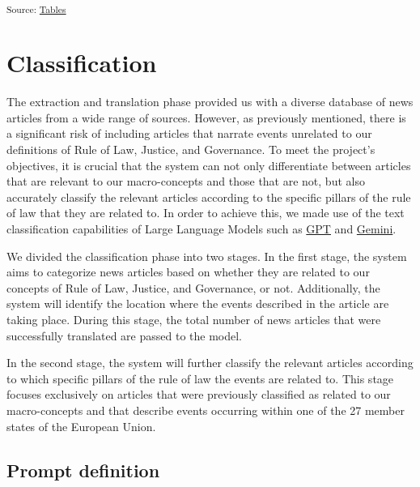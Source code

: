 \documentclass[
]{agujournal2019}
\begin{document}
\textsubscript{Source:
\href{https://ctoruno.github.io/eu-rol-tracker/notebooks/tables-preview.html\#cell-tbl-translation}{Tables}}

\section{Classification}\label{sec-class}

The extraction and translation phase provided us with a diverse database
of news articles from a wide range of sources. However, as previously
mentioned, there is a significant risk of including articles that
narrate events unrelated to our definitions of Rule of Law, Justice, and
Governance. To meet the project's objectives, it is crucial that the
system can not only differentiate between articles that are relevant to
our macro-concepts and those that are not, but also accurately classify
the relevant articles according to the specific pillars of the rule of
law that they are related to. In order to achieve this, we made use of
the text classification capabilities of Large Language Models such as
\href{https://platform.openai.com/docs/concepts}{GPT} and
\href{https://ai.google.dev/gemini-api/docs?_gl=1*1ixp628*_ga*NzAxMDUzNTUyLjE3MDQ0NTQ0NzA.*_ga_P1DBVKWT6V*MTcyNTkwNDYyMi40OC4wLjE3MjU5MDQ2MjIuNjAuMC41MjU1MDg0ODg.}{Gemini}.

We divided the classification phase into two stages. In the first stage,
the system aims to categorize news articles based on whether they are
related to our concepts of Rule of Law, Justice, and Governance, or not.
Additionally, the system will identify the location where the events
described in the article are taking place. During this stage, the total
number of news articles that were successfully translated are passed to
the model.

In the second stage, the system will further classify the relevant
articles according to which specific pillars of the rule of law the
events are related to. This stage focuses exclusively on articles that
were previously classified as related to our macro-concepts and that
describe events occurring within one of the 27 member states of the
European Union.

\subsection{Prompt definition}\label{sec-promptdef}
\end{document}
